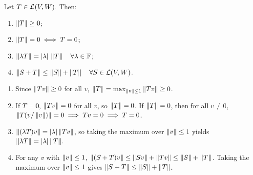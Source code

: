 \begin{thm}
  \label{thm: basic properties of norms of linear maps}
  Let $T\in \linmap(V,W)$. Then:
  \begin{enumerate}[label=\textbf{(\alph*)}]
    \item $\norm{T} \geq 0$;
    \item $\norm{T} = 0 \iff T = 0$;
    \item $\norm{\lambda T} = |\lambda| \, \norm{T}  \quad \forall \lambda \in \myF$;
    \item $\norm{S+T} \leq \norm{S} + \norm{T} \quad \forall S \in \linmap(V,W)$.
  \end{enumerate}
\end{thm}
\begin{prf}
  \begin{enumerate}[label=\textbf{(\alph*)}]
    \item Since $\norm{Tv} \geq 0$ for all $v$, $\norm{T} = \max_{\norm{v} \leq 1} \norm{Tv} \geq 0$.
    \item If $T = 0$, $\norm{Tv} = 0$ for all $v$, so $\norm{T} = 0$. If $\norm{T} = 0$, then for all $v \neq 0$, $\norm{T(v/\norm{v})} = 0 \implies Tv = 0 \implies T = 0$.
    \item $\norm{(\lambda T)v} = |\lambda| \norm{Tv}$, so taking the maximum over $\norm{v} \leq 1$ yields $\norm{\lambda T} = |\lambda| \norm{T}$.
    \item For any $v$ with $\norm{v} \leq 1$, $\norm{(S+T)v} \leq \norm{Sv} + \norm{Tv} \leq \norm{S} + \norm{T}$. Taking the maximum over $\norm{v} \leq 1$ gives $\norm{S+T} \leq \norm{S} + \norm{T}$.
  \end{enumerate}
  \vspace{-\baselineskip}
\end{prf}

